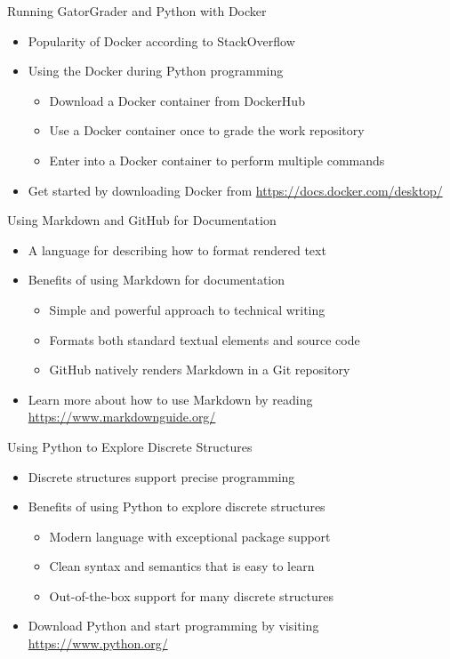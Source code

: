 \documentclass[14pt,aspectratio=169]{beamer}
\begin{document}
%
\begin{frame}{Running GatorGrader and Python with Docker}
%
  \begin{itemize}
    \item Popularity of Docker according to StackOverflow
    \item Using the Docker during Python programming
      \begin{itemize}
        \item Download a Docker container from DockerHub
        \item Use a Docker container once to grade the work repository
        \item Enter into a Docker container to perform multiple commands
      \end{itemize}
    \item Get started by downloading Docker from \url{https://docs.docker.com/desktop/}
  \end{itemize}
%
\end{frame}

%
\begin{frame}{Using Markdown and GitHub for Documentation}
%
  \begin{itemize}
    \item A language for describing how to format rendered text
    \item Benefits of using Markdown for documentation
      \begin{itemize}
        \item Simple and powerful approach to technical writing
        \item Formats both standard textual elements and source code
        \item GitHub natively renders Markdown in a Git repository
      \end{itemize}
    \item Learn more about how to use Markdown by reading \url{https://www.markdownguide.org/}
  \end{itemize}
%
\end{frame}

%
\begin{frame}{Using Python to Explore Discrete Structures}
%
  \begin{itemize}
    \item Discrete structures support precise programming
    \item Benefits of using Python to explore discrete structures
      \begin{itemize}
        \item Modern language with exceptional package support
        \item Clean syntax and semantics that is easy to learn
        \item Out-of-the-box support for many discrete structures
      \end{itemize}
    \item Download Python and start programming by visiting \url{https://www.python.org/}
  \end{itemize}
%
\end{frame}
\end{document}

